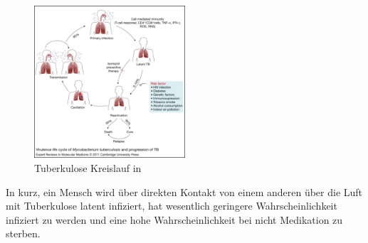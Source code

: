 \documentclass[paper=a4, fontsize=11pt, ngerman, abstract=on]{scrartcl}
\numberwithin{equation}{section} %
\numberwithin{figure}{section} %
\numberwithin{table}{section} %
\begin{document}
\begin{figure}[ht]
  \centering
  \includegraphics[width=0.5\textwidth,keepaspectratio]{images/tuberculosis-cycle}
  \caption{Tuberkulose Kreislauf in \cite{Kumar2011}}
  \label{fig:tuberculosis-cycle}
\end{figure}

In kurz, ein Mensch wird über direkten Kontakt von einem anderen über die Luft mit Tuberkulose latent infiziert, hat wesentlich geringere Wahrscheinlichkeit infiziert zu werden und eine hohe Wahrscheinlichkeit bei nicht Medikation zu sterben.
\end{document}
